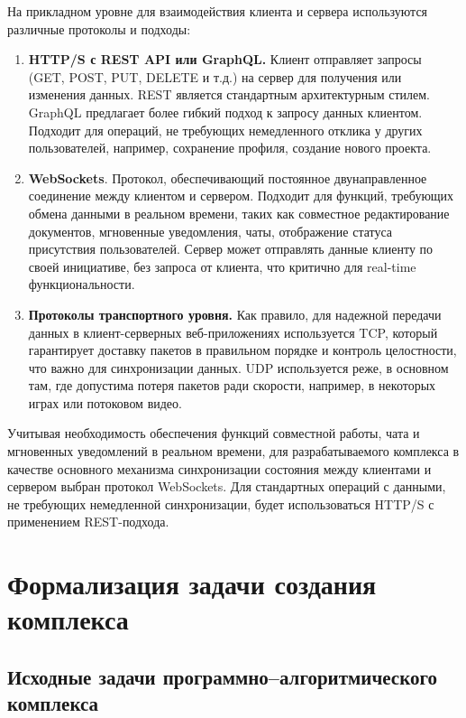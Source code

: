На прикладном уровне для взаимодействия клиента и сервера используются различные протоколы и подходы:

\begin{enumerate}[wide=12.5mm, leftmargin=12.5mm]
\item \textbf{HTTP/S с REST API или GraphQL.} Клиент отправляет запросы (GET, POST, PUT, DELETE и т.д.) на сервер для получения или изменения данных. REST является стандартным архитектурным стилем. GraphQL предлагает более гибкий подход к запросу данных клиентом. Подходит для операций, не требующих немедленного отклика у других пользователей, например, сохранение профиля, создание нового проекта.
\item \textbf{WebSockets}. Протокол, обеспечивающий постоянное двунаправленное соединение между клиентом и сервером. Подходит для функций, требующих обмена данными в реальном времени, таких как совместное редактирование документов, мгновенные уведомления, чаты, отображение статуса присутствия пользователей. Сервер может отправлять данные клиенту по своей инициативе, без запроса от клиента, что критично для real-time функциональности.
\item \textbf{Протоколы транспортного уровня.} Как правило, для надежной передачи данных в клиент-серверных веб-приложениях используется TCP, который гарантирует доставку пакетов в правильном порядке и контроль целостности, что важно для синхронизации данных. UDP используется реже, в основном там, где допустима потеря пакетов ради скорости, например, в некоторых играх или потоковом видео.
\end{enumerate}

Учитывая необходимость обеспечения функций совместной работы, чата и мгновенных уведомлений в реальном времени, для разрабатываемого комплекса в качестве основного механизма синхронизации состояния между клиентами и сервером выбран протокол WebSockets. 
Для стандартных операций с данными, не требующих немедленной синхронизации, будет использоваться HTTP/S с применением REST-подхода.

\section{Формализация задачи создания комплекса}

\subsection{Исходные задачи программно--алгоритмического комплекса}

